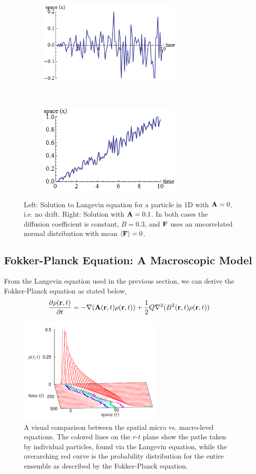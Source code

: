 \documentclass[Main.tex]{subfiles}
\begin{document}
\begin{figure}[!ht]
\centering\begin{subfigure}{.5\textwidth}
\centering\includegraphics[width=7cm]{LanNoDrift.png}
\end{subfigure}~
\centering\begin{subfigure}{.5\textwidth}
\centering\includegraphics[width=7cm]{LanDrift.png}
\end{subfigure}
\caption{Left: Solution to Langevin equation for a particle in 1D with $\mathbf{A} = 0$, i.e. no drift. Right: Solution with $\mathbf{A} = 0.1$. In both cases the diffusion coefficient is constant, $B = 0.3$, and $\mathbf{F}$ uses an uncorrelated normal distribution with mean $\left<\mathbf{F}\right> = 0$.}\label{fig:lan}
\end{figure}

\subsection{Fokker-Planck Equation: A Macroscopic Model}
From the Langevin equation used in the previous section, we can derive the Fokker-Planck equation as stated below,
\begin{equation}
\frac{\partial \rho(\mathbf{r},t)}{\partial t} = -\nabla(\mathbf{A}(\mathbf{r},t)\rho(\mathbf{r},t))+\frac{1}{2}Q\nabla^2(B^2(\mathbf{r},t)\rho(\mathbf{r},t))
\end{equation}
\begin{figure}[!ht]
\centering\includegraphics[width=7cm]{fokkerPlanck.png}
\centering\caption{A visual comparison between the spatial micro vs. macro-level equations. The colored lines on the $r$-$t$ plane show the paths taken by individual particles, found via the Langevin equation, while the overarching red curve is the probability distribution for the entire ensemble as described by the Fokker-Planck equation.}\label{fig:fokkerplanck}
\end{figure}
\end{document}
